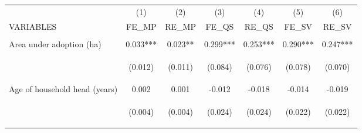 \begin{center}
\begin{tabular}{lcccccc} \hline
 & (1) & (2) & (3) & (4) & (5) & (6) \\
VARIABLES & FE\_MP & RE\_MP & FE\_QS & RE\_QS & FE\_SV & RE\_SV \\ \hline
\vspace{4pt} & \begin{footnotesize}\end{footnotesize} & \begin{footnotesize}\end{footnotesize} & \begin{footnotesize}\end{footnotesize} & \begin{footnotesize}\end{footnotesize} & \begin{footnotesize}\end{footnotesize} & \begin{footnotesize}\end{footnotesize} \\
Area under adoption (ha) & 0.033*** & 0.023** & 0.299*** & 0.253*** & 0.290*** & 0.247*** \\
\vspace{4pt} & \begin{footnotesize}(0.012)\end{footnotesize} & \begin{footnotesize}(0.011)\end{footnotesize} & \begin{footnotesize}(0.084)\end{footnotesize} & \begin{footnotesize}(0.076)\end{footnotesize} & \begin{footnotesize}(0.078)\end{footnotesize} & \begin{footnotesize}(0.070)\end{footnotesize} \\
Age of household head (years) & 0.002 & 0.001 & -0.012 & -0.018 & -0.014 & -0.019 \\
\vspace{4pt} & \begin{footnotesize}(0.004)\end{footnotesize} & \begin{footnotesize}(0.004)\end{footnotesize} & \begin{footnotesize}(0.024)\end{footnotesize} & \begin{footnotesize}(0.024)\end{footnotesize} & \begin{footnotesize}(0.022)\end{footnotesize} & \begin{footnotesize}(0.022)\end{footnotesize} \\

\end{tabular}
\end{center}
